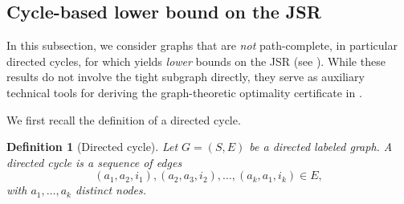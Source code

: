 \documentclass[letterpaper, 10 pt, conference]{ieeeconf}  %
\newtheorem{definition}{Definition}
\begin{document}
\subsection{Cycle-based lower bound on the JSR}
In this subsection, we consider graphs that are \emph{not} path-complete, in particular directed cycles, for which  yields \emph{lower} bounds on the JSR (see ). While these results do not involve the tight subgraph directly, they serve as auxiliary technical tools for deriving the graph-theoretic optimality certificate in .

We first recall the definition of a directed cycle.
\begin{definition}[Directed cycle]
Let $G=(S,E)$ be a directed labeled graph.  
A directed cycle is a sequence of edges
\[
(a_1,a_2,i_1), (a_2,a_3,i_2), \dots, (a_k,a_1,i_k) \in E,
\]
with $a_1,\dots,a_k$ distinct nodes.
\end{definition}
\end{document}
